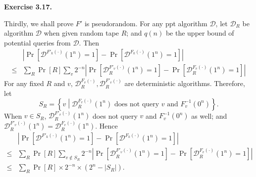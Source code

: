 \documentclass[a4paper]{article}
\newenvironment{exercise}[1]{
	\par
	\noindent\textbf{Exercise #1.}\quad
}{
	\par
	\bigskip
}
\newcommand{\abs}[1]{\left| #1 \right|}
\newcommand{\pbra}[1]{\left( #1 \right)}
\newcommand{\cbra}[1]{\left\{ #1 \right\}}
\newcommand{\sbra}[1]{\left[ #1 \right]}
\newcommand{\ppt}{{\sc ppt} }
\begin{document}
\begin{exercise}{3.17}
    Thirdly, we shall prove $F'$ is pseudorandom.
    For any \ppt algorithm $\mathcal D$, let $\mathcal D_R$ be algorithm $\mathcal D$ when given random tape $R$;
    and $q(n)$ be the upper bound of potential queries from $\mathcal D$.
    Then
    \begin{align*}
        &\abs{\Pr\sbra{\mathcal D^{F'_k(\cdot)}(1^n)=1}-\Pr\sbra{\mathcal D^{F_k(\cdot)}(1^n)=1}}\\
        \leq&\sum_R
        \Pr\sbra{R}\sum_v
        2^{-n}
        \abs{\Pr\sbra{\mathcal D_R^{F'_v(\cdot)}(1^n)=1}-\Pr\sbra{\mathcal D_R^{F_v(\cdot)}(1^n)=1}}
    \end{align*}
    For any fixed $R$ and $v$, $\mathcal D_R^{F_v(\cdot)},\mathcal D_R^{F'_v(\cdot)}$ are deterministic algorithms.
    Therefore, let
    $$
    S_R=\cbra{v\middle|\mathcal D_R^{F_v(\cdot)}(1^n)\text{ does not query $v$ and $F_v^{-1}(0^n)$}}.
    $$
    When $v\in S_R$, $\mathcal D_R^{F'_v(\cdot)}(1^n)$ does not query $v$ and $F_v^{-1}(0^n)$ as well;
    and $\mathcal D_R^{F'_v(\cdot)}(1^n)=\mathcal D_R^{F_v(\cdot)}(1^n)$. Hence
    \begin{align*}
        &\abs{\Pr\sbra{\mathcal D^{F'_k(\cdot)}(1^n)=1}-\Pr\sbra{\mathcal D^{F_k(\cdot)}(1^n)=1}}\\
        \leq&\sum_R
        \Pr\sbra{R}\sum_{v\notin S_R}
        2^{-n}
        \abs{\Pr\sbra{\mathcal D_R^{F'_v(\cdot)}(1^n)=1}-\Pr\sbra{\mathcal D_R^{F_v(\cdot)}(1^n)=1}}\\
        \leq&\sum_R\Pr\sbra{R}\times 2^{-n}\times\pbra{2^n-\abs{S_R}}.
    \end{align*}


\end{exercise}
\end{document}
